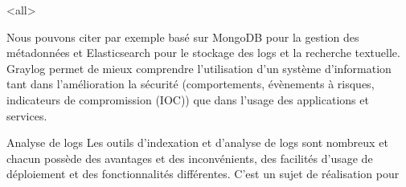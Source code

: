 \mode<all>{}


Nous pouvons citer par exemple  basé sur MongoDB pour la gestion des métadonnées et Elasticsearch pour le stockage des logs et la recherche textuelle. Graylog  permet de mieux comprendre l’utilisation d'un système d'information tant dans l'amélioration la sécurité (comportements, évènements à risques, indicateurs de compromission (IOC)) que dans l'usage des applications et services.


\begin{techworkbox}{Analyse de logs}
	Les outils d'indexation et d'analyse de logs sont nombreux et chacun possède des avantages et des inconvénients, des facilités d'usage de déploiement et des fonctionnalités différentes. C'est un sujet de réalisation pour \fichetech
\end{techworkbox}






